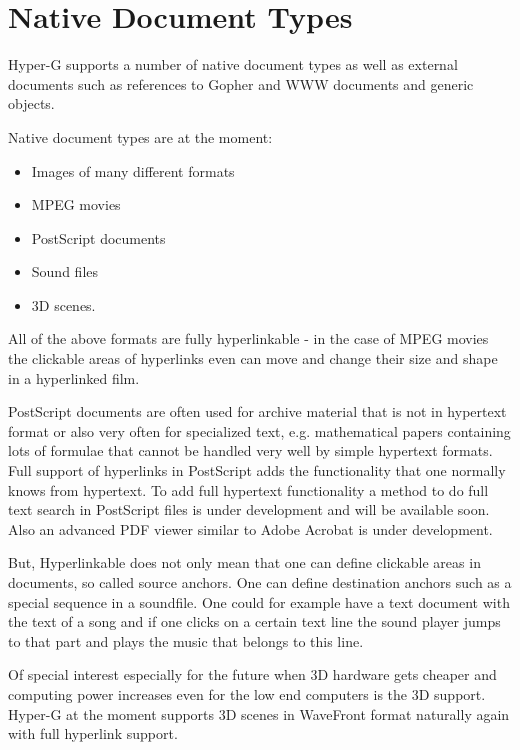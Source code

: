 \section{Native Document Types}

Hyper-G supports a number of native document types as well as external
documents such as references to Gopher and WWW documents and generic
objects.

Native document types are at the moment:
\begin{itemize}

\item Images of many different formats

\item MPEG movies

\item PostScript documents

\item Sound files

\item 3D scenes.

\end{itemize}

All of the above formats are fully hyperlinkable - in the case of MPEG
movies the clickable areas of hyperlinks even can move and change
their size and shape in a hyperlinked film.

PostScript documents are often used for archive material that is not
in hypertext format or also very often for specialized text,
e.g. mathematical papers containing lots of formulae that cannot be
handled very well by simple hypertext formats. Full support of
hyperlinks in PostScript adds the functionality that one normally
knows from hypertext. To add full hypertext functionality a method to
do full text search in PostScript files is under development and will
be available soon. Also an advanced PDF viewer similar to Adobe
Acrobat is under development.

But, Hyperlinkable does not only mean that one can define clickable
areas in documents, so called source anchors. One can define
destination anchors such as a special sequence in a soundfile. One
could for example have a text document with the text of a song and if
one clicks on a certain text line the sound player jumps to that part
and plays the music that belongs to this line.

Of special interest especially for the future when 3D hardware gets
cheaper and computing power increases even for the low end computers
is the 3D support. Hyper-G at the moment supports 3D scenes in
WaveFront format naturally again with full hyperlink support.

